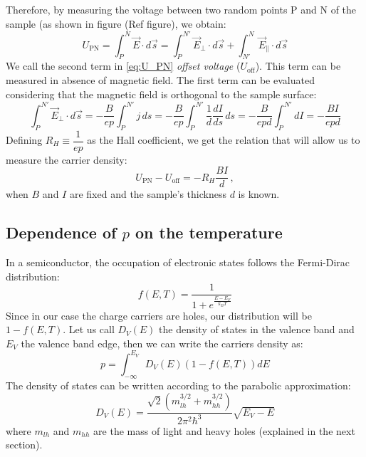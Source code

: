 \documentclass[11pt,a4paper]{article}
\begin{document}
Therefore, by measuring the voltage between two random points P and N of the sample (as shown in figure ({\color{red}Ref figure}), we obtain:
\begin{equation}\label{eq:U_PN}
U_\text{PN}=\int_P^N\vec{E}\cdot d\vec{s}=\int_P^{N'}\vec{E}_\perp\cdot d\vec{s}+\int_{N'}^N\vec{E}_\parallel\cdot d\vec{s}
\end{equation}
We call the second term in \eqref{eq:U_PN} \emph{offset voltage} ($U_\text{off}$). This term can be measured in absence of magnetic field. The first term can be evaluated considering that the magnetic field is orthogonal to the sample surface:
\begin{equation}
\int_P^{N'}\vec{E}_\perp\cdot d\vec{s}=-\frac{B}{ep}\int_P^{N'}j\, ds=-\frac{B}{ep}\int_P^{N'}\frac{1}{d}\frac{dI}{ds}\, ds=-\frac{B}{epd}\int_P^{N'} dI=-\frac{BI}{epd}
\end{equation}
Defining $R_H\equiv\dfrac{1}{ep}$ as the Hall coefficient, we get the relation that will allow us to measure the carrier density:
\begin{equation}\label{eq:Hall_voltage}
U_\text{PN}-U_\text{off}=-R_H\frac{BI}{d}\,,
\end{equation}
when $B$ and $I$ are fixed and the sample's thickness $d$ is known.

\subsection{Dependence of $p$ on the temperature}

In a semiconductor, the occupation of electronic states follows the Fermi-Dirac distribution:
\begin{equation*}
f(E,T)=\frac{1}{1+e^{\frac{E-E_F}{k_BT}}}
\end{equation*}
Since in our case the charge carriers are holes, our distribution will be $1-f(E,T)$. Let us call $D_V(E)$ the density of states in the valence band and $E_V$ the valence band edge, then we can write the carriers density as:
\begin{equation}
p=\int_{-\infty}^{E_V}D_V(E)(1-f(E,T))dE
\end{equation}
The density of states can be written according to the parabolic approximation:
\begin{equation*}
D_V(E)=\frac{\sqrt{2}(m_{lh}^{3/2}+m_{hh}^{3/2})}{2\pi^2\hbar^3}\sqrt{E_V-E}
\end{equation*} where $m_{lh}$ and $m_{hh}$ are the mass of light and heavy holes (explained in the next section).
\end{document}

